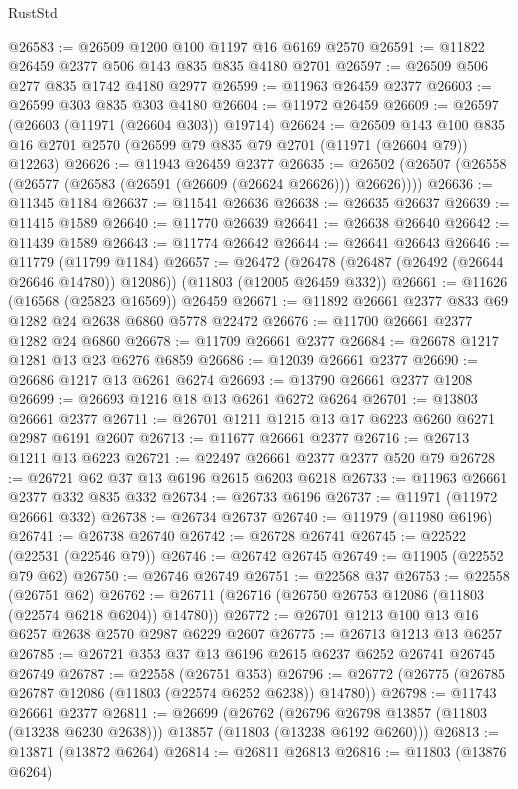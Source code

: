 \begin{lexlean}{RustStd}
\begin{coremodule}
@26583 := @26509 @1200 @100 @1197 @16 @6169 @2570
@26591 := @11822 @26459 @2377 @506 @143 @835 @835 @4180 @2701
@26597 := @26509 @506 @277 @835 @1742 @4180 @2977
@26599 := @11963 @26459 @2377
@26603 := @26599 @303 @835 @303 @4180
@26604 := @11972 @26459
@26609 := @26597 (@26603 (@11971 (@26604 @303)) @19714)
@26624 := @26509
    @143
    @100
    @835
    @16
    @2701
    @2570
    (@26599 @79 @835 @79 @2701 (@11971 (@26604 @79)) @12263)
@26626 := @11943 @26459 @2377
@26635 := @26502 (@26507 (@26558 (@26577 (@26583 (@26591 (@26609 (@26624 @26626))) @26626))))
@26636 := @11345 @1184
@26637 := @11541 @26636
@26638 := @26635 @26637
@26639 := @11415 @1589
@26640 := @11770 @26639
@26641 := @26638 @26640
@26642 := @11439 @1589
@26643 := @11774 @26642
@26644 := @26641 @26643
@26646 := @11779 (@11799 @1184)
@26657 := @26472
    (@26478 (@26487 (@26492 (@26644 @26646 @14780)) @12086))
    (@11803 (@12005 @26459 @332))
@26661 := @11626 (@16568 (@25823 @16569)) @26459
@26671 := @11892 @26661 @2377 @833 @69 @1282 @24 @2638 @6860 @5778 @22472
@26676 := @11700 @26661 @2377 @1282 @24 @6860
@26678 := @11709 @26661 @2377
@26684 := @26678 @1217 @1281 @13 @23 @6276 @6859
@26686 := @12039 @26661 @2377
@26690 := @26686 @1217 @13 @6261 @6274
@26693 := @13790 @26661 @2377 @1208
@26699 := @26693 @1216 @18 @13 @6261 @6272 @6264
@26701 := @13803 @26661 @2377
@26711 := @26701 @1211 @1215 @13 @17 @6223 @6260 @6271 @2987 @6191 @2607
@26713 := @11677 @26661 @2377
@26716 := @26713 @1211 @13 @6223
@26721 := @22497 @26661 @2377 @2377 @520 @79
@26728 := @26721 @62 @37 @13 @6196 @2615 @6203 @6218
@26733 := @11963 @26661 @2377 @332 @835 @332
@26734 := @26733 @6196
@26737 := @11971 (@11972 @26661 @332)
@26738 := @26734 @26737
@26740 := @11979 (@11980 @6196)
@26741 := @26738 @26740
@26742 := @26728 @26741
@26745 := @22522 (@22531 (@22546 @79))
@26746 := @26742 @26745
@26749 := @11905 (@22552 @79 @62)
@26750 := @26746 @26749
@26751 := @22568 @37
@26753 := @22558 (@26751 @62)
@26762 := @26711 (@26716 (@26750 @26753 @12086 (@11803 (@22574 @6218 @6204)) @14780))
@26772 := @26701 @1213 @100 @13 @16 @6257 @2638 @2570 @2987 @6229 @2607
@26775 := @26713 @1213 @13 @6257
@26785 := @26721 @353 @37 @13 @6196 @2615 @6237 @6252 @26741 @26745 @26749
@26787 := @22558 (@26751 @353)
@26796 := @26772 (@26775 (@26785 @26787 @12086 (@11803 (@22574 @6252 @6238)) @14780))
@26798 := @11743 @26661 @2377
@26811 := @26699
    (@26762
      (@26796 @26798 @13857 (@11803 (@13238 @6230 @2638)))
      @13857
      (@11803 (@13238 @6192 @6260)))
@26813 := @13871 (@13872 @6264)
@26814 := @26811 @26813
@26816 := @11803 (@13876 @6264)

\end{coremodule}
\end{lexlean}
